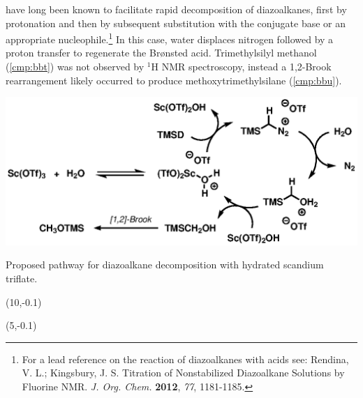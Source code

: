 have long been known to facilitate rapid decomposition of diazoalkanes, first by
protonation and then by subsequent substitution with the conjugate base or an
appropriate nucleophile.\footnote{For a lead reference on the reaction of diazoalkanes with acids
see: {\frenchspacing Rendina, V. L.; Kingsbury, J. S. Titration of Nonstabilized Diazoalkane
Solutions by Fluorine NMR. \textit{J. Org. Chem.} \textbf{2012}, \textit{77}, 1181-1185.}} In this
case, water displaces nitrogen followed by a proton transfer to regenerate the Br{\o}nsted acid.
Trimethylsilyl methanol (\ref{cmp:bbt}) was not observed by $^1$H NMR
spectroscopy, instead a 1,2-Brook rearrangement likely occurred to produce
methoxytrimethylsilane (\ce{->}\ref{cmp:bbu}). 
\begin{Scheme}[t]
  \centering \includegraphics[scale=0.8]{chp_singlecarbon/images/scwatereq}
  \caption{Proposed pathway for diazoalkane decomposition with hydrated
  scandium triflate.}
\begin{textblock}{1}(10,-0.1)  \end{textblock}
\begin{textblock}{1}(5,-0.1)  \end{textblock}		
  \label{sch:scwatereq}
\end{Scheme}


